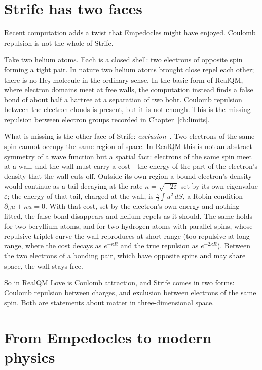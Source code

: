 \section{Strife has two faces}\label{sec:strife-two-faces}

Recent computation adds a twist that Empedocles might have enjoyed. Coulomb repulsion is not the whole of
Strife.

Take two helium atoms. Each is a closed shell: two electrons of opposite spin forming a tight pair. In
nature two helium atoms brought close repel each other; there is no He$_2$ molecule in the ordinary sense.
In the basic form of RealQM, where electron domains meet at free walls, the computation instead finds a
false bond of about half a hartree at a separation of two bohr. Coulomb repulsion between the electron
clouds is present, but it is not enough. This is the missing repulsion between electron groups recorded in
Chapter~\ref{ch:limits}.

What is missing is the other face of Strife: \emph{exclusion}~\cite{Pauli1925}. Two electrons of the same
spin cannot occupy the same region of space. In RealQM this is not an abstract symmetry of a wave function
but a spatial fact: electrons of the same spin meet at a wall, and the wall must carry a cost---the energy
of the part of the electron's density that the wall cuts off. Outside its own region a bound electron's
density would continue as a tail decaying at the rate $\kappa=\sqrt{-2\varepsilon}$ set by its own
eigenvalue $\varepsilon$; the energy of that tail, charged at the wall, is $\tfrac{\kappa}{2}\int u^2\,dS$,
a Robin condition $\partial_n u+\kappa u=0$. With that cost, set by the electron's own energy and nothing
fitted, the false bond disappears and helium repels as it should. The same holds for two beryllium atoms,
and for two hydrogen atoms with parallel spins, whose repulsive triplet curve the wall reproduces at short range (too repulsive at long range, where the cost decays as $e^{-\kappa R}$ and the true repulsion as $e^{-2\kappa R}$). Between
the two electrons of a bonding pair, which have opposite spins and may share space, the wall stays free.

So in RealQM Love is Coulomb attraction, and Strife comes in two forms: Coulomb repulsion between charges,
and exclusion between electrons of the same spin. Both are statements about matter in three-dimensional
space.

\section{From Empedocles to modern physics}\label{sec:empedocles-modern}

